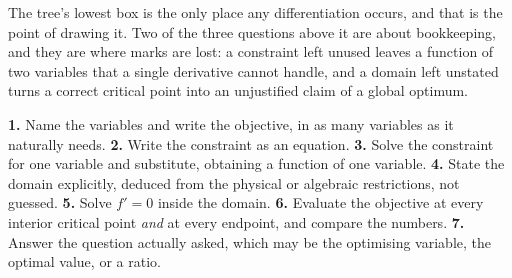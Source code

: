 \begin{center}
\end{center}

The tree's lowest box is the only place any differentiation occurs, and that is the point of drawing it. Two of the three questions above it are about bookkeeping, and they are where marks are lost: a constraint left unused leaves a function of two variables that a single derivative cannot handle, and a domain left unstated turns a correct critical point into an unjustified claim of a global optimum.

\begin{keynote}
\textbf{1.} Name the variables and write the objective, in as many variables as it naturally needs. \textbf{2.} Write the constraint as an equation. \textbf{3.} Solve the constraint for one variable and substitute, obtaining a function of one variable. \textbf{4.} State the domain explicitly, deduced from the physical or algebraic restrictions, not guessed. \textbf{5.} Solve $f'=0$ inside the domain. \textbf{6.} Evaluate the objective at every interior critical point \emph{and} at every endpoint, and compare the numbers. \textbf{7.} Answer the question actually asked, which may be the optimising variable, the optimal value, or a ratio.
\end{keynote}

